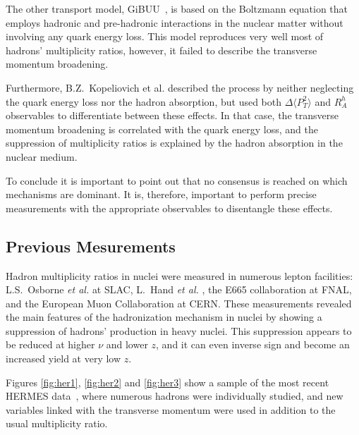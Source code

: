 The other transport model, GiBUU~\cite{Gallmeister:2007an}, is based on the 
Boltzmann equation that employs hadronic and pre-hadronic interactions in the nuclear matter without involving any quark energy loss. This model reproduces very well most of hadrons' multiplicity ratios, however, it failed to describe the transverse momentum broadening. 

Furthermore, B.Z.~Kopeliovich et al. \cite{Kopeliovich:2008uy} described the process by neither neglecting the quark energy loss nor the hadron absorption, but used both $\Delta \langle P_T^2 \rangle$ and $R_A^h$ observables to differentiate between these effects. In that case, the transverse momentum broadening is correlated with the quark energy loss, and the suppression of multiplicity ratios is explained by the hadron absorption in the nuclear medium.

To conclude it is important to point out that no consensus is reached on which 
mechanisms are dominant. It is, therefore, important to perform precise measurements with the appropriate observables to disentangle these effects.


\subsection{Previous Mesurements}
\label{sec:exp}

Hadron multiplicity ratios in nuclei were measured in numerous lepton 
facilities: L.S.~Osborne {\it et al.} \cite{Osborne:1978ai} at SLAC,
L.~Hand {\it et al.} \cite{Hand:1978tx}, the E665 collaboration \cite{Adams:1994ri} at FNAL, and the European Muon Collaboration \cite{Arvidson:1984fz,Ashman:1991cx} at CERN. These measurements revealed the main features of the hadronization mechanism
in nuclei by showing a suppression of hadrons' production in heavy nuclei.
This suppression appears to be reduced at higher $\nu$ and lower $z$, and it 
can even inverse sign and become an increased yield at very low $z$. 

Figures \ref{fig:her1}, \ref{fig:her2} and \ref{fig:her3} show a sample of 
the most recent HERMES data~\cite{Airapetian:2007vu}, where numerous hadrons were individually studied, and new variables linked with the transverse momentum were used in addition to the usual multiplicity ratio.

